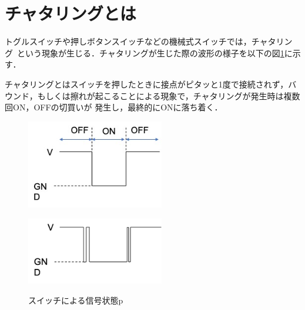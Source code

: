 \documentclass[a4paper,11pt]{jsarticle}
\begin{document}
\section{チャタリングとは}
トグルスイッチや押しボタンスイッチなどの機械式スイッチでは，チャタリング~\cite{chataring}という現象が生じる．チャタリングが生じた際の波形の様子を以下の図\ref{P:chata}に示す．

チャタリングとはスイッチを押したときに接点がピタッと1度で接続されず，バウンド，もしくは擦れが起こることによる現象で，チャタリングが発生時は複数回ON，OFFの切買いが
発生し，最終的にONに落ち着く．
\begin{figure}[H]
  \begin{minipage}{0.48\textwidth}
    \begin{center}
      \includegraphics[clip,width=6cm]{picture/chata1.jpg}
    \end{center}
    \label{chata1}
  \end{minipage}
  \begin{minipage}{0.48\textwidth}
    \begin{center}
      \includegraphics[clip,width=6cm]{picture/chata2.png}
    \end{center}
    \label{chata2}
  \end{minipage}
  \caption{スイッチによる信号状態p}
  \label{P:chata}
\end{figure}
\end{document}
